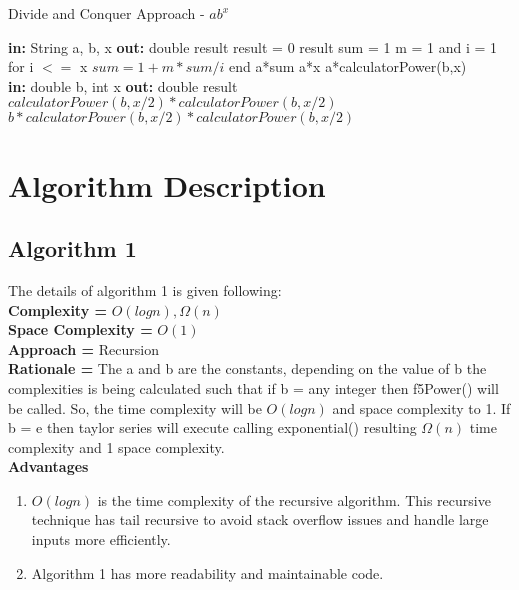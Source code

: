 \documentclass[10pt]{article}
\begin{document}
\begin{algorithm}
\caption{Divide and Conquer Approach -  $ab^x$}
\begin{algorithmic}
\State \textbf{in: } String a, b, x
\State \textbf{out: } double result
\State  result = 0
    \Return result
\Else 
    \State sum = 1
    \State m = 1 and i = 1
    \State for i $<=$ x 
    \State $sum = 1+m*sum/i$
    \State end
\State \Return a*sum
    \Else 
        \EndIf
            \Return a*x
        \Else    
        \State \Return a*calculatorPower(b,x)
        \EndIf
\EndIf
\EndIf
\EndProcedure
\\
\State \textbf{in: } double b, int x
\State \textbf{out: } double result
\State {}
\State \Return $calculatorPower(b, x/2)*calculatorPower(b, x/2)$
\Else
\State \Return $b * calculatorPower(b, x/2)*calculatorPower(b, x/2)$
\EndIf

\EndProcedure
\end{algorithmic}
\end{algorithm}


\section{Algorithm Description}
\subsection{Algorithm 1}
The details of algorithm 1 is given following:
\\\textbf{ Complexity = } $O(logn), \Omega(n)$
\\\textbf{Space Complexity = } $O(1)$
\\\textbf{Approach = } Recursion
\\\textbf{Rationale = } The a and b are the constants, depending on the value of b the complexities is being calculated such that if b = any integer then f5Power() will be called. So, the time complexity will be $O(logn)$ and space complexity to 1. If b = e then taylor series will execute calling exponential() resulting $\Omega(n)$ time complexity and 1 space complexity.
\\\textbf{Advantages}
\begin{enumerate}
    \item $O (log n)$ is the time complexity of the recursive algorithm. This recursive technique has tail recursive to avoid stack overflow issues and handle large inputs more efficiently.
    \item Algorithm 1 has more readability and maintainable code.
\end{enumerate}
\end{document}
